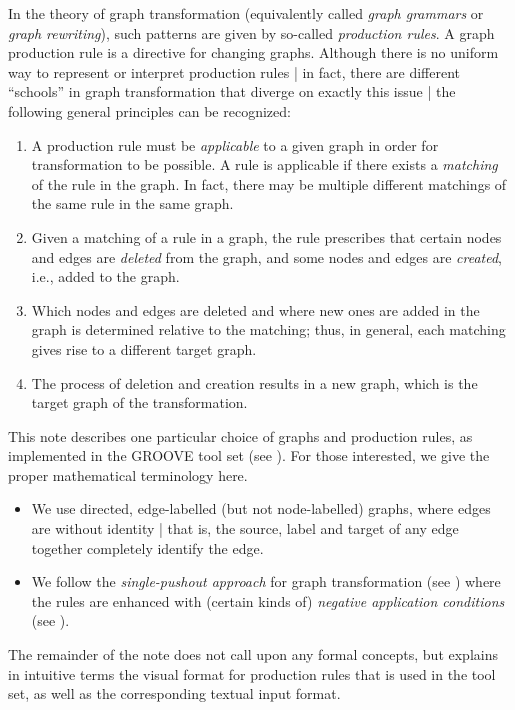 In the theory of graph transformation (equivalently called \emph{graph
grammars} or \emph{graph rewriting}), such patterns are given by
so-called \emph{production rules}. A graph production rule is a directive for
changing graphs. Although there is no uniform way to represent or 
interpret production rules | in fact, there are different ``schools'' in graph
transformation that diverge on exactly this issue | the following general
principles can be recognized:
\begin{enumerate}
\item A production rule must be \emph{applicable} to a given graph in order for 
   transformation to be possible. A rule is applicable if there exists a
  \emph{matching} of the rule in the graph. In fact, there may be multiple
  different matchings of the same rule in the same graph.
\item Given a matching of a rule in a graph, the rule prescribes that certain
  nodes and edges are \emph{deleted} from the graph, and some nodes and edges
  are \emph{created}, i.e., added to the graph.
\item Which nodes and edges are deleted and where new ones are added in the
  graph is determined relative to the matching; thus, in general, each matching
  gives rise to a different target graph.
\item The process of deletion and creation results in a new graph, which is the
  target graph of the transformation.
\end{enumerate}

This note describes one particular choice of graphs and production rules, as
implemented in the GROOVE tool set (see \cite{Rensink2003a}). For those interested,
we give the proper mathematical terminology here.

\begin{itemize}
\item We use directed, edge-labelled (but not node-labelled) graphs, where
  edges are without identity | that is, the source, label and target of any
  edge together completely identify the edge.
\item We follow the \emph{single-pushout approach} for graph transformation
  (see \cite{Loewe1993,Ehrig+1997}) where the rules are enhanced with (certain kinds
  of) \emph{negative application conditions} (see \cite{HabelHecTae1996}).
\end{itemize}
The remainder of the note does not call upon any formal concepts, but explains
in intuitive terms the visual format for production rules that is used in
the tool set, as well as the corresponding textual input format.


